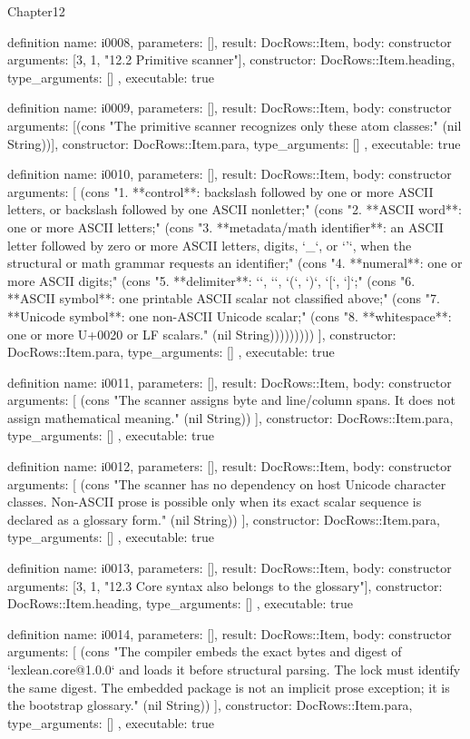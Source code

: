 \begin{lexlean}{Chapter12}
\begin{semanticmodule}
definition{
  name: i0008,
  parameters: [],
  result: DocRows::Item,
  body: constructor{
    arguments: [3, 1, "12.2 Primitive scanner"],
    constructor: DocRows::Item.heading,
    type_arguments: []
  },
  executable: true
}

definition{
  name: i0009,
  parameters: [],
  result: DocRows::Item,
  body: constructor{
    arguments: [(cons "The primitive scanner recognizes only these atom classes:" (nil String))],
    constructor: DocRows::Item.para,
    type_arguments: []
  },
  executable: true
}

definition{
  name: i0010,
  parameters: [],
  result: DocRows::Item,
  body: constructor{
    arguments: [
      (cons "1. **control**: backslash followed by one or more ASCII letters, or backslash followed by one ASCII nonletter;" (cons "2. **ASCII word**: one or more ASCII letters;" (cons "3. **metadata/math identifier**: an ASCII letter followed by zero or more ASCII letters, digits, `_`, or `'`, when the structural or math grammar requests an identifier;" (cons "4. **numeral**: one or more ASCII digits;" (cons "5. **delimiter**: `{`, `}`, `(`, `)`, `[`, `]`;" (cons "6. **ASCII symbol**: one printable ASCII scalar not classified above;" (cons "7. **Unicode symbol**: one non-ASCII Unicode scalar;" (cons "8. **whitespace**: one or more U+0020 or LF scalars." (nil String)))))))))
    ],
    constructor: DocRows::Item.para,
    type_arguments: []
  },
  executable: true
}

definition{
  name: i0011,
  parameters: [],
  result: DocRows::Item,
  body: constructor{
    arguments: [
      (cons "The scanner assigns byte and line/column spans. It does not assign mathematical meaning." (nil String))
    ],
    constructor: DocRows::Item.para,
    type_arguments: []
  },
  executable: true
}

definition{
  name: i0012,
  parameters: [],
  result: DocRows::Item,
  body: constructor{
    arguments: [
      (cons "The scanner has no dependency on host Unicode character classes. Non-ASCII prose is possible only when its exact scalar sequence is declared as a glossary form." (nil String))
    ],
    constructor: DocRows::Item.para,
    type_arguments: []
  },
  executable: true
}

definition{
  name: i0013,
  parameters: [],
  result: DocRows::Item,
  body: constructor{
    arguments: [3, 1, "12.3 Core syntax also belongs to the glossary"],
    constructor: DocRows::Item.heading,
    type_arguments: []
  },
  executable: true
}

definition{
  name: i0014,
  parameters: [],
  result: DocRows::Item,
  body: constructor{
    arguments: [
      (cons "The compiler embeds the exact bytes and digest of `lexlean.core@1.0.0` and loads it before structural parsing. The lock must identify the same digest. The embedded package is not an implicit prose exception; it is the bootstrap glossary." (nil String))
    ],
    constructor: DocRows::Item.para,
    type_arguments: []
  },
  executable: true
}


\end{semanticmodule}
\end{lexlean}
